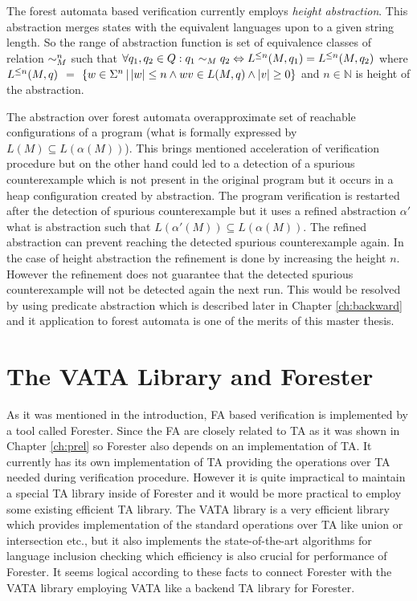 The forest automata based verification currently employs \emph{height abstraction}.
This abstraction merges states with the equivalent languages upon to a given string length.
So the range of abstraction function is set of equivalence classes of relation $\sim^n_M$
such that $\forall q_1,q_2 \in Q: q_1 \sim_M q_2 \Leftrightarrow L^{\leq n}(M,q_1) = L^{\leq n}(M,q_2)$ where
$L^{\leq n}(M,q)$ $=$ $\{ w \in \Sigma^n \,|\, |w| \leq n \wedge wv \in L(M,q) \wedge |v| \geq 0\}$
and $n\in \mathbb{N}$ is height of the abstraction.

The abstraction over forest automata overapproximate set of reachable
configurations of a program (what is formally expressed by $L(M) \subseteq L(\alpha(M))$).
This brings mentioned acceleration of verification procedure but on the other hand
could led to a detection of a spurious counterexample which is not present
in the original program but it occurs in a heap configuration created by abstraction.
The program verification is restarted after the detection of spurious counterexample
but it uses a refined abstraction $\alpha'$ what is abstraction such that $L(\alpha'(M)) \subseteq L(\alpha(M))$.
The refined abstraction can prevent reaching the detected spurious counterexample again.
In the case of height abstraction the refinement is done by increasing the height $n$.
However the refinement does not guarantee that the detected spurious counterexample will not
be detected again the next run.
This would be resolved by using predicate abstraction which is described later in Chapter \ref{ch:backward}
and it application to forest automata is one of the merits of this master thesis.

\chapter{The VATA Library and Forester}
\label{ch:tools}

As it was mentioned in the introduction, FA based verification is implemented by a tool
called Forester.
Since the FA are closely related to TA as it was shown in Chapter \ref{ch:prel} so
Forester also depends on an implementation of TA.
It currently has its own implementation of TA providing the operations over TA needed during verification procedure.
However it is quite impractical to maintain a special TA library inside of Forester
and it would be more practical to employ some existing efficient TA library.
The VATA library is a very efficient library which provides implementation of the standard operations over TA like union or intersection etc.,
but it also implements the state-of-the-art algorithms \cite{tacas10} for language inclusion checking which efficiency
is also crucial for performance of Forester.
It seems logical according to these facts to connect Forester with the VATA library employing VATA like a backend TA library for Forester.

